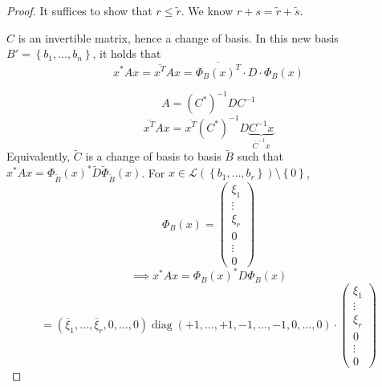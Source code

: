 \documentclass[a4paper]{article}
\numberwithin{lecref}{section}
\newcommand{\set}[1]{\left\{#1\right\}}
\begin{document}
\begin{proof}
  It suffices to show that $r \leq \tilde r$.
  We know $r+s = \tilde r + \tilde s$.

  $C$ is an invertible matrix, hence a change of basis.
  In this new basis $B' = \set{b_1, \dots, b_n}$, it holds that
  \[ x^* A x = \overline{x^T} A x = \overline{\Phi_B(x)^T} \cdot D \cdot \Phi_B(x) \]

  \[ A = (C^*)^{-1} D C^{-1} \]
  \[ \overline{x^T} A x = \overline{x^T} (C^*)^{-1} D \underbrace{C^{-1} x}_{\overline{C}^{-1} x} \]
  Equivalently, $\tilde C$ is a change of basis to basis $\tilde B$
  such that $x^* Ax = \Phi_{\tilde B}(x)^* \tilde D \tilde\Phi_{\tilde B}(x)$.
  For $x \in \mathcal L(\set{b_1, \dots, b_r}) \setminus \set{0}$,
  \[ \Phi_B(x) = \begin{pmatrix} \xi_1 \\ \vdots \\ \xi_r \\ 0 \\ \vdots \\ 0 \end{pmatrix} \]
  \[ \implies x^* A x = \Phi_B(x)^* D \Phi_B(x) \]
  \[
    = (\overline{\xi}_1, \dots, \overline{\xi}_r, 0, \dots, 0)
    \operatorname{diag}(+1, \dots, +1, -1, \dots, -1, 0, \dots, 0)
    \cdot
    \begin{pmatrix}
      \xi_1 \\ \vdots \\ \xi_r \\ 0 \\ \vdots \\ 0

\end{pmatrix}\]
\end{proof}
\end{document}
